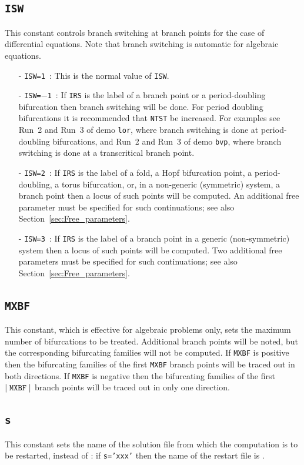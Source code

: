 \documentclass[12pt]{report}
\def\abs#1{\mid#1\mid}
\begin{document}
\subsection{\tt ISW}  \label{sec:ISW}
 This constant controls branch switching at branch points for the case
 of differential equations.
 Note that branch switching is automatic for algebraic equations.
\begin{itemize}
\item[-] {\tt ISW=1}~: This is the normal value of {\tt ISW}.
\item[-] {\tt ISW=$-$1}~:
  If {\tt IRS} is the label of a branch point or a period-doubling
  bifurcation then branch switching will be done.
  For period doubling bifurcations it is recommended that {\tt NTST} be increased.
  For examples see Run~2 and Run~3 of demo {\tt lor}, where branch switching
  is done at period-doubling bifurcations, and Run~2 and Run~3 of demo {\tt bvp},
  where branch switching is done at a transcritical branch point.
\item[-] {\tt ISW=2}~:
  If {\tt IRS} is the label of a fold, a Hopf bifurcation point, 
  a period-doubling, a torus bifurcation, or, in a non-generic
  (symmetric) system, a branch point then a locus of such points will be
  computed. An additional free parameter must be specified for such 
  continuations; see also Section~\ref{sec:Free_parameters}.
\item[-] {\tt ISW=3}~:
  If {\tt IRS} is the label of a branch point in a generic
  (non-symmetric) system then a locus of such points will be
  computed. Two additional free parameters must be specified for such 
  continuations; see also Section~\ref{sec:Free_parameters}.
\end{itemize}

\subsection{\tt MXBF}  \label{sec:MXBF}
 This constant, which is effective for algebraic problems only,
 sets the maximum number of bifurcations to be treated.
 Additional branch points will be noted, but the corresponding bifurcating
 families will not be computed.
 If {\tt MXBF} is positive then the bifurcating families of the first {\tt MXBF}
  branch points will be traced out in both directions.
 If {\tt MXBF} is negative then the bifurcating families of the first 
 $\abs{{\tt MXBF}}$ branch points will be traced out in only one direction. 

\subsection{\tt s}  \label{sec:s}
This constant sets the name of the solution file from which the computation
is to be restarted, instead of : if {\tt s='xxx'} then the
name of the restart file is .
\end{document}
